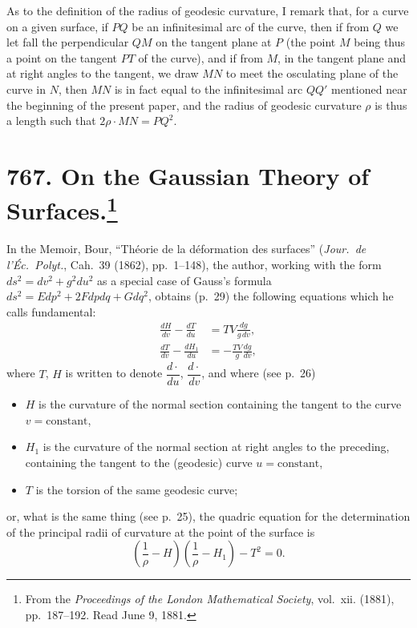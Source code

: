 \documentclass[11pt,a4paper]{article}
\theoremstyle{definition}
\begin{document}
As to the definition of the radius of geodesic curvature, I remark that, for a curve on a given surface, if $PQ$ be an infinitesimal arc of the curve, then if from $Q$ we let fall the perpendicular $QM$ on the tangent plane at $P$ (the point $M$ being thus a point on the tangent $PT$ of the curve), and if from $M$, in the tangent plane and at right angles to the tangent, we draw $MN$ to meet the osculating plane of the curve in $N$, then $MN$ is in fact equal to the infinitesimal arc $QQ'$ mentioned near the beginning of the present paper, and the radius of geodesic curvature $\rho$ is thus a length such that $2\rho \cdot MN = PQ^2$.

\newpage
\section[On the Gaussian Theory of Surfaces]{767. On the Gaussian Theory of Surfaces.\footnote{From the \textit{Proceedings of the London Mathematical Society}, vol.~xii. (1881), pp.~187--192. Read June 9, 1881.}}

In the Memoir, Bour, ``Th\'eorie de la d\'eformation des surfaces'' (\textit{Jour.~de l'\'Ec.~Polyt.}, Cah.~39 (1862), pp.~1--148), the author, working with the form $ds^2 = dv^2 + g^2 du^2$ as a special case of Gauss's formula $ds^2 = Edp^2 + 2Fdpdq + Gdq^2$, obtains (p.~29) the following equations which he calls fundamental:
\[
\begin{aligned}
\frac{dH}{dv} - \frac{dT}{du} &= TV \frac{dg}{g\,dv},\\
\frac{dT}{dv} - \frac{dH_1}{du} &= -\frac{TV}{g} \frac{dg}{dv},
\end{aligned}
\tag{IV.}
\]
where $T$, $H$ is written to denote $\dfrac{d\cdot}{du}$, $\dfrac{d\cdot}{dv}$, and where (see p.~26)
\begin{itemize}[noitemsep]
\item $H$ is the curvature of the normal section containing the tangent to the curve $v = \text{constant}$,
\item $H_1$ is the curvature of the normal section at right angles to the preceding, containing the tangent to the (geodesic) curve $u = \text{constant}$,
\item $T$ is the torsion of the same geodesic curve;
\end{itemize}
or, what is the same thing (see p.~25), the quadric equation for the determination of the principal radii of curvature at the point of the surface is
\[
\left(\frac{1}{\rho} - H\right)\left(\frac{1}{\rho} - H_1\right) - T^2 = 0.
\]
\end{document}
